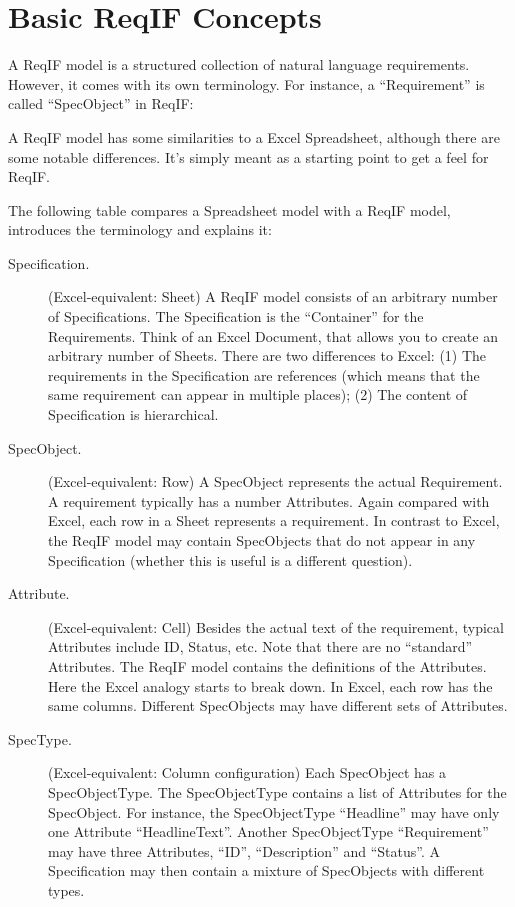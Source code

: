 \section{Basic ReqIF Concepts}

A ReqIF model is a structured collection of natural language
requirements. However, it comes with its own terminology. For instance,
a ``Requirement'' is called ``SpecObject'' in ReqIF:

A ReqIF model has some similarities to a Excel Spreadsheet, although
there are some notable differences. It's simply meant as a starting
point to get a feel for ReqIF.

The following table compares a Spreadsheet model with a ReqIF model,
introduces the terminology and explains it:

\begin{description}
  \item[Specification.] (Excel-equivalent: Sheet)  A ReqIF model
consists of an arbitrary number of Specifications. The Specification is
the ``Container'' for the Requirements. Think of an Excel Document, that
allows you to create an arbitrary number of Sheets. There are two
differences to Excel: (1) The requirements in the Specification are
references (which means that the same requirement can appear in multiple
places); (2) The content of Specification is hierarchical.

  \item[SpecObject.] (Excel-equivalent: Row) A SpecObject represents the actual
Requirement. A requirement typically has a number Attributes. Again
compared with Excel, each row in a Sheet represents a requirement. In
contrast to Excel, the ReqIF model may contain SpecObjects that do not
appear in any Specification (whether this is useful is a different
question).

  \item[Attribute.] (Excel-equivalent: Cell) Besides the actual text of the
requirement, typical Attributes include ID, Status, etc. Note that there
are no ``standard'' Attributes. The ReqIF model contains the definitions
of the Attributes. Here the Excel analogy starts to break down. In
Excel, each row has the same columns. Different SpecObjects may have
different sets of Attributes.

  \item[SpecType.] (Excel-equivalent: Column configuration) Each SpecObject
has a SpecObjectType. The SpecObjectType contains a list of Attributes
for the SpecObject. For instance, the SpecObjectType ``Headline'' may
have only one Attribute ``HeadlineText''. Another SpecObjectType
``Requirement'' may have three Attributes, ``ID'', ``Description'' and
``Status''. A Specification may then contain a mixture of SpecObjects
with different types.

\end{description}

